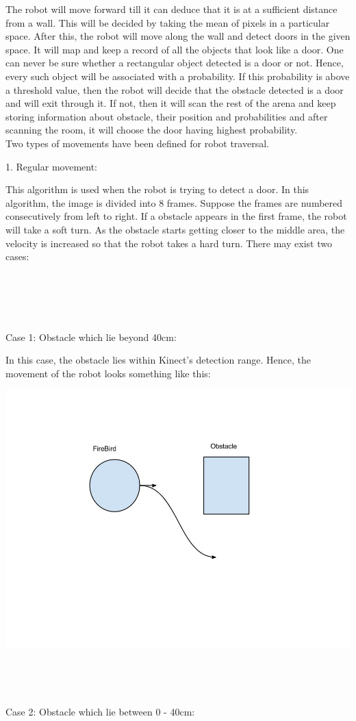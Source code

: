 \documentclass{report}
\begin{document}
The robot will move forward till it can deduce that it is at a sufficient distance from a wall. 
This will be decided by taking the mean of pixels in a particular space. After this, the robot
will move along the wall and detect doors in the given space. It will map and keep a record of all the objects that look 
like a door. One can never be sure whether a rectangular object detected is a door or not. Hence, 
every such object will be associated with a probability. If this probability is above a threshold 
value, then the robot will decide that the obstacle detected is a door and will exit through it. 
If not, then it will scan the rest of the arena and keep storing information about obstacle, their 
position and probabilities and after scanning the room, it will choose the door having highest
probability. \\
Two types of movements have been defined for robot traversal.

1. Regular movement:

This algorithm is used when the robot is trying to detect a door. In this algorithm, the image is divided into 8 frames. Suppose the frames are numbered consecutively from left to right. If a obstacle appears in the first frame, the robot will take a soft turn. As the obstacle starts getting closer to the middle area, the velocity is increased so that the robot takes a hard turn. There may exist two cases:
\\ \\ \\ \\ \\ \\
Case 1: Obstacle which lie beyond 40cm:

In this case, the obstacle lies within Kinect's detection range. Hence, the movement of the robot looks something like this:

\includegraphics[width = 20CM]{Case_1.jpg}
\\ \\ \\ \\ \\
Case 2: Obstacle which lie between 0 - 40cm:
\end{document}
